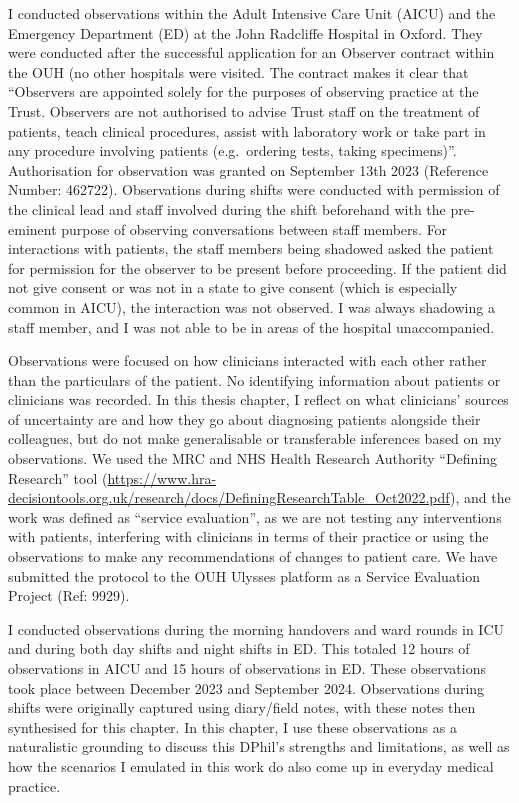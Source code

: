 \documentclass[a4paper, nobind]{templates/ociamthesis}
\begin{document}
\hfill\break
I conducted observations within the Adult Intensive Care Unit (AICU) and the Emergency Department (ED) at the John Radcliffe Hospital in Oxford. They were conducted after the successful application for an Observer contract within the OUH (no other hospitals were visited. The contract makes it clear that ``Observers are appointed solely for the purposes of observing practice at the Trust. Observers are not authorised to advise Trust staff on the treatment of patients, teach clinical procedures, assist with laboratory work or take part in any procedure involving patients (e.g.~ordering tests, taking specimens)''. Authorisation for observation was granted on September 13th 2023 (Reference Number: 462722). Observations during shifts were conducted with permission of the clinical lead and staff involved during the shift beforehand with the pre-eminent purpose of observing conversations between staff members. For interactions with patients, the staff members being shadowed asked the patient for permission for the observer to be present before proceeding. If the patient did not give consent or was not in a state to give consent (which is especially common in AICU), the interaction was not observed. I was always shadowing a staff member, and I was not able to be in areas of the hospital unaccompanied.

\hfill\break
Observations were focused on how clinicians interacted with each other rather than the particulars of the patient. No identifying information about patients or clinicians was recorded. In this thesis chapter, I reflect on what clinicians' sources of uncertainty are and how they go about diagnosing patients alongside their colleagues, but do not make generalisable or transferable inferences based on my observations. We used the MRC and NHS Health Research Authority ``Defining Research'' tool (\url{https://www.hra-decisiontools.org.uk/research/docs/DefiningResearchTable_Oct2022.pdf}), and the work was defined as ``service evaluation'', as we are not testing any interventions with patients, interfering with clinicians in terms of their practice or using the observations to make any recommendations of changes to patient care. We have submitted the protocol to the OUH Ulysses platform as a Service Evaluation Project (Ref: 9929).

\hfill\break
I conducted observations during the morning handovers and ward rounds in ICU and during both day shifts and night shifts in ED. This totaled 12 hours of observations in AICU and 15 hours of observations in ED. These observations took place between December 2023 and September 2024. Observations during shifts were originally captured using diary/field notes, with these notes then synthesised for this chapter. In this chapter, I use these observations as a naturalistic grounding to discuss this DPhil's strengths and limitations, as well as how the scenarios I emulated in this work do also come up in everyday medical practice.
\end{document}
